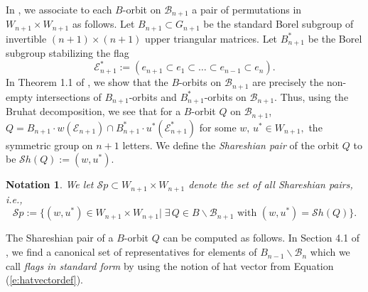 \documentclass[12pt]{amsart}
\numberwithin{equation}{section}
\newtheorem{nota}[thm]{Notation}
\newcommand{\B}{\mathcal{B}}
\newcommand{\Borbitspace}{B_{n-1}\backslash\B_{n}}
\newcommand{\Sh}{\mathcal{S}h}
\newcommand{\Sp}{\mathcal{S}p}
\begin{document}
 In \cite{Shpairs}, we associate to each $B$-orbit on $\B_{n+1}$ a pair 
 of permutations in $W_{n+1}\times W_{n+1}$ as follows.  
 Let $B_{n+1}\subset G_{n+1}$ be the standard Borel subgroup of invertible $(n+1)\times (n+1)$ upper triangular matrices.  Let $B_{n+1}^{*}$ be the Borel subgroup stabilizing the flag 
 \begin{equation}\label{eq:E*flag}
 \mathcal{E}_{n+1}^{*}:=(e_{n+1}\subset e_{1}\subset \dots\subset e_{n-1}\subset e_{n}). 
 \end{equation}
 In Theorem 1.1 of \cite{Shpairs}, we show that the $B$-orbits on $\B_{n+1}$ are precisely the non-empty intersections of $B_{n+1}$-orbits and $B_{n+1}^{*}$-orbits on $\B_{n+1}.$  
  Thus, using the Bruhat decomposition, we see that for a $B$-orbit $Q$ on $\B_{n+1}$, 
 $Q=B_{n+1}\cdot w(\mathcal{E}_{n+1}) \cap B_{n+1}^{*}\cdot u^{*}(\mathcal{E}_{n+1}^{*})$ for some $w,\, u^{*}\in W_{n+1},$ the symmetric group on $n+1$ letters.
 We define the \emph{Shareshian pair} of the orbit $Q$ to be $\Sh(Q):=(w,u^{*})$.  
 \begin{nota}
 We let $\Sp\subset W_{n+1}\times W_{n+1}$ denote the set of all Shareshian pairs, i.e.,
 \begin{equation}\label{eq:Spdefn}
 \Sp:=\{(w,u^{*})\in W_{n+1}\times W_{n+1}|\; \exists\, Q\in B\backslash\B_{n+1}\mbox{ with } (w, u^{*})=\Sh(Q)\}. 
 \end{equation}
 
 \end{nota}
 
 The Shareshian pair of a $B$-orbit $Q$ can be computed as follows.  In Section 4.1 of \cite{CE21II}, we find a canonical set of representatives for 
elements of $\Borbitspace$ which we call \emph{flags in standard form} by using the notion of hat vector from Equation (\ref{e:hatvectordef}).  
\end{document}
